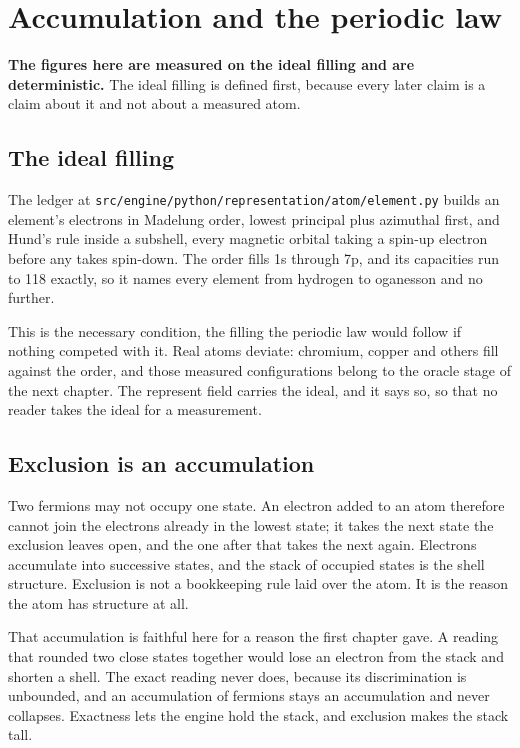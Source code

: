 \chapter{Accumulation and the periodic law}

\textbf{The figures here are measured on the ideal filling and are deterministic.} The ideal filling
is defined first, because every later claim is a claim about it and not about a measured atom.

\section{The ideal filling}

The ledger at
\texttt{src/\allowbreak{}engine/\allowbreak{}python/\allowbreak{}representation/\allowbreak{}atom/\allowbreak{}element.py}
builds an element's electrons in Madelung order, lowest principal plus azimuthal first, and Hund's
rule inside a subshell, every magnetic orbital taking a spin-up electron before any takes spin-down.
The order fills 1s through 7p, and its capacities run to 118 exactly, so it names every element from
hydrogen to oganesson and no further.

This is the necessary condition, the filling the periodic law would follow if nothing competed with
it. Real atoms deviate: chromium, copper and others fill against the order, and those measured
configurations belong to the oracle stage of the next chapter. The represent field carries the ideal,
and it says so, so that no reader takes the ideal for a measurement.

\section{Exclusion is an accumulation}

Two fermions may not occupy one state. An electron added to an atom therefore cannot join the
electrons already in the lowest state; it takes the next state the exclusion leaves open, and the one
after that takes the next again. Electrons accumulate into successive states, and the stack of
occupied states is the shell structure. Exclusion is not a bookkeeping rule laid over the atom. It is
the reason the atom has structure at all.

That accumulation is faithful here for a reason the first chapter gave. A reading that rounded two
close states together would lose an electron from the stack and shorten a shell. The exact reading
never does, because its discrimination is unbounded, and an accumulation of fermions stays an
accumulation and never collapses. Exactness lets the engine hold the stack, and exclusion makes the
stack tall.

